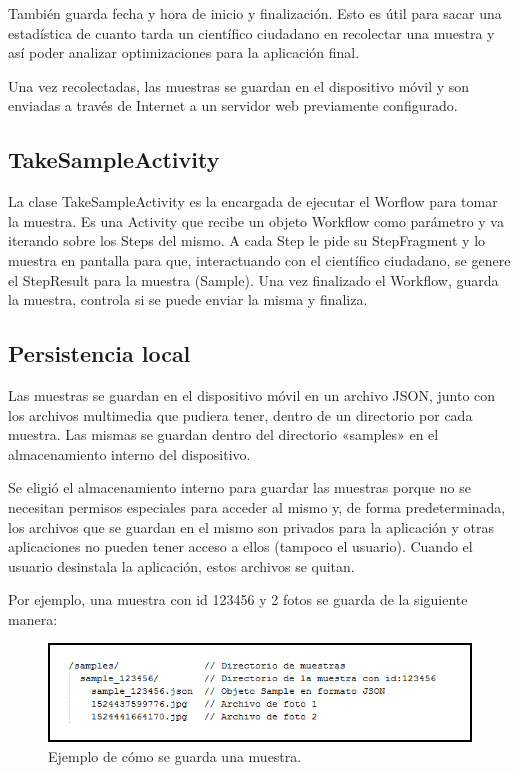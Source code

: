También guarda fecha y hora de inicio y finalización. Esto es útil para sacar una estadística de cuanto tarda un científico ciudadano en recolectar una muestra y así poder analizar optimizaciones para la aplicación final.

Una vez recolectadas, las muestras se guardan en el dispositivo móvil y son enviadas a través de Internet a un servidor web previamente configurado.

\subsection{TakeSampleActivity}
La clase TakeSampleActivity es la encargada de ejecutar el Worflow para tomar la muestra. Es una Activity que recibe un objeto Workflow como parámetro y va iterando sobre los Steps del mismo. A cada Step le pide su StepFragment y lo muestra en pantalla para que, interactuando con el científico ciudadano, se genere el StepResult para la muestra (Sample). Una vez finalizado el Workflow, guarda la muestra, controla si se puede enviar la misma y finaliza.



\subsection{Persistencia local}\label{sec:persistencia_local}
Las muestras se guardan en el dispositivo móvil en un archivo JSON, junto con los archivos multimedia que pudiera tener, dentro de un directorio por cada muestra. Las mismas se guardan dentro del directorio «samples» en el almacenamiento interno del dispositivo.

Se eligió el almacenamiento interno para guardar las muestras porque no se necesitan permisos especiales para acceder al mismo y, de forma predeterminada, los archivos que se guardan en el mismo son privados para la aplicación y otras aplicaciones no pueden tener acceso a ellos (tampoco el usuario). Cuando el usuario desinstala la aplicación, estos archivos se quitan\cite{androidInternalStorage}.

Por ejemplo, una muestra con id 123456 y 2 fotos se guarda de la siguiente manera:

\begin{figure}[H]
  \centering
    \includegraphics[scale=0.8]{05-implementacion/persistencia_local.png} 
   \caption{Ejemplo de cómo se guarda una muestra.}
\end{figure}		

